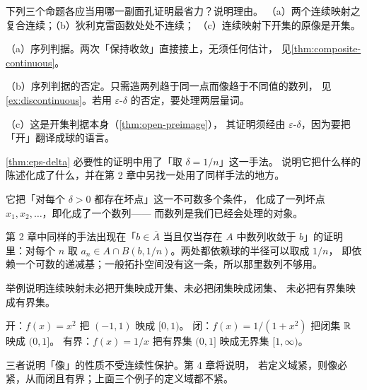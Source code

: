 \begin{exercise}[结构]
  \label{exr:which-face}
  下列三个命题各应当用哪一副面孔证明最省力？说明理由。
  （a）两个连续映射之复合连续；（b）狄利克雷函数处处不连续；
  （c）连续映射下开集的原像是开集。
  \begin{solution}
    （a）序列判据。两次「保持收敛」直接接上，无须任何估计，
    见\cref{thm:composite-continuous}。

    （b）序列判据的否定。只需造两列趋于同一点而像趋于不同值的数列，
    见\cref{ex:discontinuous}。若用 \(\varepsilon\)-\(\delta\) 的否定，要处理两层量词。

    （c）这是开集判据本身（\cref{thm:open-preimage}），
    其证明须经由 \(\varepsilon\)-\(\delta\)，因为要把「开」翻译成球的语言。
  \end{solution}
\end{exercise}

\begin{exercise}[结构]
  \label{exr:delta-1-over-n}
  \cref{thm:eps-delta} 必要性的证明中用了「取 \(\delta=1/n\)」这一手法。
  说明它把什么样的陈述化成了什么，并在第 2 章中另找一处用了同样手法的地方。
  \begin{solution}
    它把「对每个 \(\delta>0\) 都存在坏点」这一不可数多个条件，
    化成了一列坏点 \(x_{1},x_{2},\dots\)，即化成了一个数列——
    而数列是我们已经会处理的对象。

    第 2 章中同样的手法出现在「\(b \in \overline{A}\) 当且仅当存在
    \(A\) 中数列收敛于 \(b\)」的证明里：对每个 \(n\) 取
    \(a_{n} \in A \cap B(b,1/n)\)。两处都依赖球的半径可以取成 \(1/n\)，
    即依赖一个可数的递减基；一般拓扑空间没有这一条，所以那里数列不够用。
  \end{solution}
\end{exercise}

\begin{exercise}[结构]
  \label{exr:image-not-open}
  举例说明连续映射未必把开集映成开集、未必把闭集映成闭集、
  未必把有界集映成有界集。
  \begin{solution}
    开：\(f(x)=x^{2}\) 把 \((-1,1)\) 映成 \([0,1)\)。
    闭：\(f(x)=1/(1+x^{2})\) 把闭集 \(\mathbb{R}\) 映成 \((0,1]\)。
    有界：\(f(x)=1/x\) 把有界集 \((0,1]\) 映成无界集 \([1,\infty)\)。

    三者说明「像」的性质不受连续性保护。第 4 章将说明，
    若定义域紧，则像必紧，从而闭且有界；上面三个例子的定义域都不紧。
  \end{solution}
\end{exercise}

